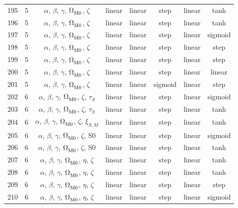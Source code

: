 \begin{longtable}{c c c c c c c c}
    195 & 5 & $\alpha$, $\beta$, $\gamma$, $\Omega_{\rm M0}^{}$, $\zeta$ & linear & linear & step & linear & tanh \\
    196 & 5 & $\alpha$, $\beta$, $\gamma$, $\Omega_{\rm M0}^{}$, $\zeta$ & linear & linear & step & linear & tanh \\
    197 & 5 & $\alpha$, $\beta$, $\gamma$, $\Omega_{\rm M0}^{}$, $\zeta$ & linear & linear & step & linear & sigmoid \\
    198 & 5 & $\alpha$, $\beta$, $\gamma$, $\Omega_{\rm M0}^{}$, $\zeta$ & linear & linear & step & linear & step \\
    199 & 5 & $\alpha$, $\beta$, $\gamma$, $\Omega_{\rm M0}^{}$, $\zeta$ & linear & linear & step & linear & step \\
    200 & 5 & $\alpha$, $\beta$, $\gamma$, $\Omega_{\rm M0}^{}$, $\zeta$ & linear & linear & step & linear & linear \\
    201 & 5 & $\alpha$, $\beta$, $\gamma$, $\Omega_{\rm M0}^{}$, $\zeta$ & linear & linear & sigmoid & linear & step \\
    202 & 6 & $\alpha$, $\beta$, $\gamma$, $\Omega_{\rm M0}^{}$, $\zeta$, $\tau_S^{}$ & linear & linear & step & linear & sigmoid \\
    203 & 6 & $\alpha$, $\beta$, $\gamma$, $\Omega_{\rm M0}^{}$, $\zeta$, $\tau_S^{}$ & linear & linear & step & linear & tanh \\
    204 & 6 & $\alpha$, $\beta$, $\gamma$, $\Omega_{\rm M0}^{}$, $\zeta$, $\xi_{S,M}^{}$ & linear & linear & step & linear & tanh \\
    205 & 6 & $\alpha$, $\beta$, $\gamma$, $\Omega_{\rm M0}^{}$, $\zeta$, S0 & linear & linear & step & linear & sigmoid \\
    206 & 6 & $\alpha$, $\beta$, $\gamma$, $\Omega_{\rm M0}^{}$, $\zeta$, S0 & linear & linear & step & linear & tanh \\
    207 & 6 & $\alpha$, $\beta$, $\gamma$, $\Omega_{\rm M0}^{}$, $\eta$, $\zeta$ & linear & linear & step & linear & tanh \\
    208 & 6 & $\alpha$, $\beta$, $\gamma$, $\Omega_{\rm M0}^{}$, $\eta$, $\zeta$ & linear & linear & step & linear & tanh \\
    209 & 6 & $\alpha$, $\beta$, $\gamma$, $\Omega_{\rm M0}^{}$, $\eta$, $\zeta$ & linear & linear & step & linear & step \\
    210 & 6 & $\alpha$, $\beta$, $\gamma$, $\Omega_{\rm M0}^{}$, $\eta$, $\zeta$ & linear & linear & step & linear & sigmoid \\

\end{longtable}
